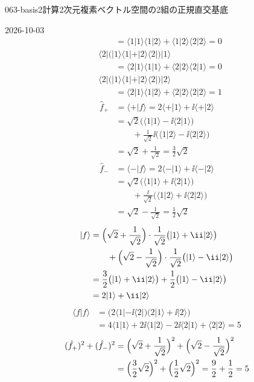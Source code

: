 \documentclass[uplatex,dvipdfmx,a4paper,11pt]{jsarticle}
\begin{document}
\begin{mondai}{063-basis2}{計算}{2次元複素ベクトル空間の2組の正規直交基底}
\begin{kotaeutsushi}{2026-10-03}
\begin{align*}
  &\qquad=\langle1|1\rangle\langle1|2\rangle+\langle1|2\rangle\langle2|2\rangle=0\\
  &\langle2|\bigl(|1\rangle\langle1|+|2\rangle\langle2|\bigr)|1\rangle\\
  &\qquad=\langle2|1\rangle\langle1|1\rangle+\langle2|2\rangle\langle2|1\rangle=0\\
  &\langle2|\bigl(|1\rangle\langle1|+|2\rangle\langle2|\bigr)|2\rangle\\
  &\qquad=\langle2|1\rangle\langle1|2\rangle+\langle2|2\rangle\langle2|2\rangle=1
\end{align*}
\begin{align*}
  \hat{f}_{+}&=\langle+|f\rangle=2\langle+|1\rangle+\ii\langle+|2\rangle\\
  &=\sqrt{2}\bigl(\langle1|1\rangle-\ii\langle2|1\rangle\bigr)\\
  &\qquad+\frac{1}{\sqrt{2}}\ii\bigl(\langle1|2\rangle-\ii\langle2|2\rangle\bigr)\\
  &=\sqrt{2}+\frac{1}{\sqrt{2}}=\frac{3}{2}\sqrt{2}\\
  \hat{f}_{-}&=\langle-|f\rangle=2\langle-|1\rangle+\ii\langle-|2\rangle\\
  &=\sqrt{2}\bigl(\langle1|1\rangle+\ii\langle2|1\rangle\bigr)\\
  &\qquad+\frac{\ii}{\sqrt{2}}\bigl(\langle1|2\rangle+\ii\langle2|2\rangle\bigr)\\
  &=\sqrt{2}-\frac{1}{\sqrt{2}}=\frac{1}{2}\sqrt{2}
\end{align*}
\begin{align*}
  |f\rangle&=\Bigl(\sqrt{2}+\frac{1}{\sqrt{2}}\Bigr)\cdot\frac{1}{\sqrt{2}}\bigl(|1\rangle+\ii|2\rangle\bigr)\\
  &\qquad+\Bigl(\sqrt{2}-\frac{1}{\sqrt{2}}\Bigr)\cdot\frac{1}{\sqrt{2}}\bigl(|1\rangle-\ii|2\rangle\bigr)\\
  &=\frac{3}{2}\bigl(|1\rangle+\ii|2\rangle\bigr)+\frac{1}{2}\bigl(|1\rangle-\ii|2\rangle\bigr)\\
  &=2|1\rangle+\ii|2\rangle
\end{align*}
\begin{align*}
  \langle f|f\rangle&=\bigl(2\langle1|-\ii\langle2|\bigr)\bigl(2|1\rangle+\ii|2\rangle\bigr)\\
  &=4\langle1|1\rangle+2\ii\langle1|2\rangle-2\ii\langle2|1\rangle+\langle2|2\rangle=5
\end{align*}
\begin{align*}
  (\hat{f}_{+})^{2}+(\hat{f}_{-})^{2}&=\Bigl(\sqrt{2}+\frac{1}{\sqrt{2}}\Bigr)^{2}+\Bigl(\sqrt{2}-\frac{1}{\sqrt{2}}\Bigr)^{2}\\
  &=\Bigl(\frac{3}{2}\sqrt{2}\Bigr)^{2}+\Bigl(\frac{1}{2}\sqrt{2}\Bigr)^{2}=\frac{9}{2}+\frac{1}{2}=5
\end{align*}
\end{kotaeutsushi}
\end{mondai}

\noteowari
\end{document}

